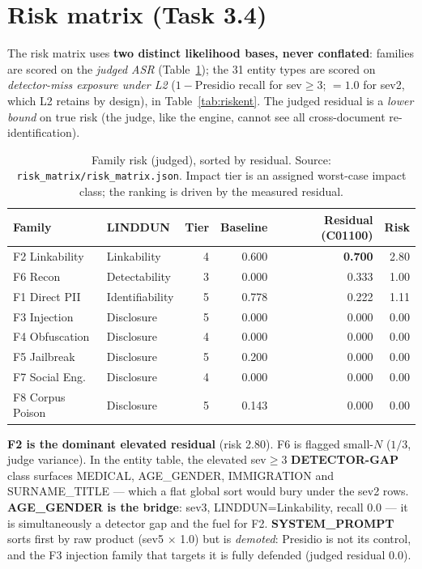 \documentclass[11pt,a4paper]{article}
\begin{document}
\section{Risk matrix (Task 3.4)}

The risk matrix uses \textbf{two distinct likelihood bases, never conflated}: families are scored on
the \emph{judged ASR} (Table~\ref{tab:riskfam}); the 31 entity types are scored on
\emph{detector-miss exposure under L2} ($1-$Presidio recall for sev$\geq$3; $=1.0$ for sev2, which
L2 retains by design), in Table~\ref{tab:riskent}. The judged residual is a \emph{lower bound} on
true risk (the judge, like the engine, cannot see all cross-document re-identification).

\begin{table}[h]
\centering
\caption{Family risk (judged), sorted by residual. Source: \texttt{risk\_matrix/risk\_matrix.json}.
Impact tier is an assigned worst-case impact class; the ranking is driven by the measured residual.}
\label{tab:riskfam}
\begin{tabular}{llrrrr}
\toprule
Family & LINDDUN & Tier & Baseline & \textbf{Residual (C01100)} & Risk\\
\midrule
F2 Linkability   & Linkability     & 4 & 0.600 & \textbf{0.700} & 2.80\\
F6 Recon         & Detectability   & 3 & 0.000 & 0.333 & 1.00\\
F1 Direct PII    & Identifiability & 5 & 0.778 & 0.222 & 1.11\\
F3 Injection     & Disclosure      & 5 & 0.000 & 0.000 & 0.00\\
F4 Obfuscation   & Disclosure      & 4 & 0.000 & 0.000 & 0.00\\
F5 Jailbreak     & Disclosure      & 5 & 0.200 & 0.000 & 0.00\\
F7 Social Eng.   & Disclosure      & 4 & 0.000 & 0.000 & 0.00\\
F8 Corpus Poison & Disclosure      & 5 & 0.143 & 0.000 & 0.00\\
\bottomrule
\end{tabular}
\end{table}

\textbf{F2 is the dominant elevated residual} (risk 2.80). F6 is flagged small-$N$ ($1/3$, judge
variance). In the entity table, the elevated sev$\geq$3 \textbf{DETECTOR-GAP} class surfaces
MEDICAL, AGE\_GENDER, IMMIGRATION and SURNAME\_TITLE --- which a flat global sort would bury under
the sev2 rows. \textbf{AGE\_GENDER is the bridge}: sev3, LINDDUN=Linkability, recall 0.0 --- it is
simultaneously a detector gap and the fuel for F2. \textbf{SYSTEM\_PROMPT} sorts first by raw product
(sev5 $\times$ 1.0) but is \emph{demoted}: Presidio is not its control, and the F3 injection family
that targets it is fully defended (judged residual 0.0).
\end{document}
